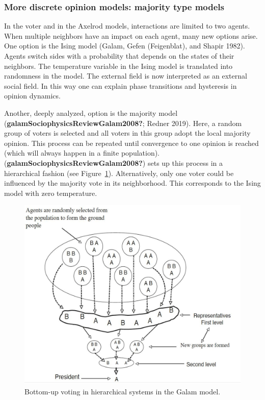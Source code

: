 \documentclass[
  a4paper,
  DIV=11,
  numbers=noendperiod,
  oneside]{scrreprt}
\begin{document}
\hypertarget{sec-More-discrete-opinion-models-majority-type-models}{%
\subsubsection{More discrete opinion models: majority type
models}\label{sec-More-discrete-opinion-models-majority-type-models}}

In the voter and in the Axelrod models, interactions are limited to two
agents. When multiple neighbors have an impact on each agent, many new
options arise. One option is the Ising model (Galam, Gefen (Feigenblat),
and Shapir 1982). Agents switch sides with a probability that depends on
the states of their neighbors. The temperature variable in the Ising
model is translated into randomness in the model. The external field is
now interpreted as an external social field. In this way one can explain
phase transitions and hysteresis in opinion dynamics.

Another, deeply analyzed, option is the majority model
(\textbf{galamSociophysicsReviewGalam2008?}; Redner 2019). Here, a
random group of voters is selected and all voters in this group adopt
the local majority opinion. This process can be repeated until
convergence to one opinion is reached (which will always happen in a
finite population). (\textbf{galamSociophysicsReviewGalam2008?}) sets up
this process in a hierarchical fashion (see
Figure~\ref{fig-ch7-img5-old-93}). Alternatively, only one voter could
be influenced by the majority vote in its neighborhood. This corresponds
to the Ising model with zero temperature.

\begin{figure}

{\centering \includegraphics{media/ch7/image5.jpg}

}

\caption{\label{fig-ch7-img5-old-93}Bottom-up voting in hierarchical
systems in the Galam model.}

\end{figure}
\end{document}
